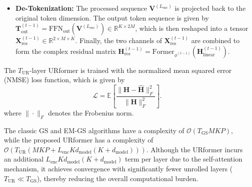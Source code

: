 \documentclass[journal]{IEEEtran}
\begin{document}
\begin{itemize}

\item \textbf{De-Tokenization: } The processed sequence $\mathbf{V}^{(L_\text{enc})}$ is projected back to the original token dimension. The output token sequence is given by $\mathbf{T}_{\text{out}}^{(t-1)}  = \text{FFN}_{\text{out}}(\mathbf{V}^{(L_\text{enc})})\in \mathbb{R}^{K \times 2M}$, which is then reshaped into a tensor $\mathbf{X}_{\text{res}}^{(t-1)}  \in \mathbb{R}^{2 \times M \times K}$. Finally, the two channels of $\mathbf{X}_{\text{res}}^{(t-1)}$ are combined to form the complex residual matrix $\mathbf{H}_{\text{res}}^{(t-1)}=\text{Former}_{{\phi}^{(t-1)}} (\mathbf{H}_{\text{linear}}^{(t-1)} )$. 
\end{itemize}

The $T_\text{UR}$-layer URformer is trained with the normalized mean squared error (NMSE) loss function, which is given by
\begin{equation}
    \mathcal{L} = \mathbb{E}\left[ \frac{\|\mathbf{H} - \hat{\mathbf{H}}\|_F^2}{\|\mathbf{H}\|_F^2} \right].
    \label{eq:loss_function}
\end{equation}
where $\|\cdot\|_F$ denotes the Frobenius norm. 

{The classic GS and EM-GS algorithms have a complexity of $\mathcal{O}(T_{\mathrm{GS}}MKP)$, while the proposed URformer has a complexity of $\mathcal{O}(T_{\mathrm{UR}}(MKP + L_{\mathrm{enc}} K d_{\mathrm{model}}(K + d_{\mathrm{model}})))$. Although the URformer incurs an additional $L_{\mathrm{enc}} K d_{\mathrm{model}}(K + d_{\mathrm{model}})$ term per layer due to the self-attention mechanism, it achieves convergence with significantly fewer unrolled layers ($T_{\mathrm{UR}} \ll T_{\mathrm{GS}}$), thereby reducing the overall computational burden.}
\end{document}
